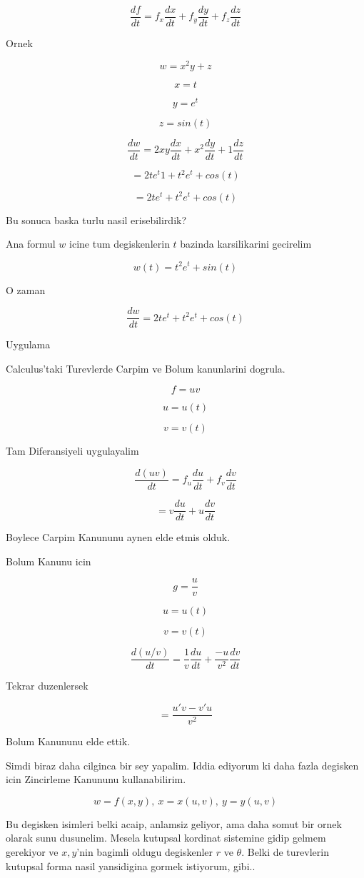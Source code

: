 \documentclass[12pt,fleqn]{article}
\begin{document}
\[ \frac{df}{dt} = f_x\frac{dx}{dt} + f_y\frac{dy}{dt} + f_z\frac{dz}{dt} \]

Ornek

\[ w = x^2y + z \]

\[ x = t \]

\[ y = e^t \]

\[ z = sin(t) \]

\[ \frac{dw}{dt} = 2xy \frac{dx}{dt} + x^2 \frac{dy}{dt} + 1 \frac{dz}{dt}\]

\[ = 2te^t 1 + t^2e^t+cos(t) \]

\[ = 2te^t + t^2e^t+cos(t) \]

Bu sonuca baska turlu nasil erisebilirdik? 

Ana formul $w$ icine tum degiskenlerin $t$ bazinda karsilikarini gecirelim

\[ w(t) = t^2e^t + sin(t) \]

O zaman

\[ \frac{dw}{dt} = 2te^t + t^2e^t + cos(t) \]

Uygulama

Calculus'taki Turevlerde Carpim ve Bolum kanunlarini dogrula. 

\[ f = uv \]

\[ u=u(t) \]

\[ v=v(t) \]

Tam Diferansiyeli uygulayalim

\[ \frac{d(uv)}{dt} = f_u\frac{du}{dt} + f_v \frac{dv}{dt}\]

\[  = v\frac{du}{dt} + u \frac{dv}{dt}\]

Boylece Carpim Kanununu aynen elde etmis olduk. 

Bolum Kanunu icin

\[ g = \frac{u}{v} \]

\[ u=u(t) \]

\[ v=v(t) \]

\[ \frac{d(u/v)}{dt} = \frac{1}{v} \frac{du}{dt} + \frac{-u}{v^2}\frac{dv}{dt}\]

Tekrar duzenlersek

\[ = \frac{u'v - v'u}{v^2} \]

Bolum Kanununu elde ettik.

Simdi biraz daha cilginca bir sey yapalim. Iddia ediyorum ki daha fazla
degisken icin Zincirleme Kanununu kullanabilirim. 

\[ w = f(x,y), \ x = x(u,v), \ y = y(u,v) \]

Bu degisken isimleri belki acaip, anlamsiz geliyor, ama daha somut bir
ornek olarak sunu dusunelim. Mesela kutupsal kordinat sistemine gidip
gelmem gerekiyor ve $x,y$'nin bagimli oldugu degiskenler $r$ ve
$\theta$. Belki de turevlerin kutupsal forma nasil yansidigina gormek
istiyorum, gibi..
\end{document}
